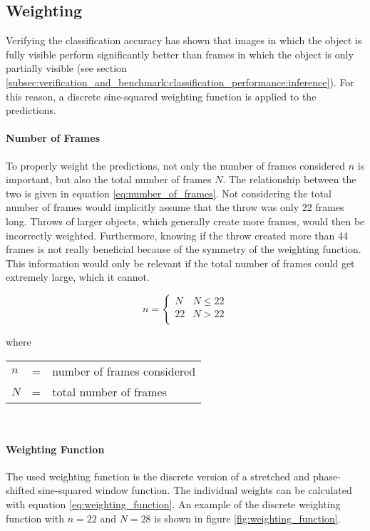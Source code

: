 \subsection{Weighting}
\label{subsec:inference:app:weighting}

Verifying the classification accuracy has shown that images in which the object is fully visible perform significantly better than frames in which the object is only partially visible (see section \ref{subsec:verification_and_benchmark:classification_performance:inference}).
For this reason, a discrete sine-squared weighting function is applied to the predictions.

\paragraph{Number of Frames}
To properly weight the predictions, not only the number of frames considered $n$ is important, but also the total number of frames $N$.
The relationship between the two is given in equation \ref{eq:number_of_frames}.
Not considering the total number of frames would implicitly assume that the throw was only \num{22} frames long.
Throws of larger objects, which generally create more frames, would then be incorrectly weighted.
Furthermore, knowing if the throw created more than \num{44} frames is not really beneficial because of the symmetry of the weighting function.
This information would only be relevant if the total number of frames could get extremely large, which it cannot.

\begin{equation}
  n =
  \begin{cases}
    N & N \leq 22 \\
    22 & N > 22 \\
  \end{cases}
  \label{eq:number_of_frames}
\end{equation}

where

\begin{tabular}{lll}
  $n$ & = & number of frames considered \\
  $N$ & = & total number of frames \\
\end{tabular}
\\

\paragraph{Weighting Function}
The used weighting function is the discrete version of a stretched and phase-shifted sine-squared window function.
The individual weights can be calculated with equation \ref{eq:weighting_function}.
An example of the discrete weighting function with $n = 22$ and $N = 28$ is shown in figure \ref{fig:weighting_function}.

